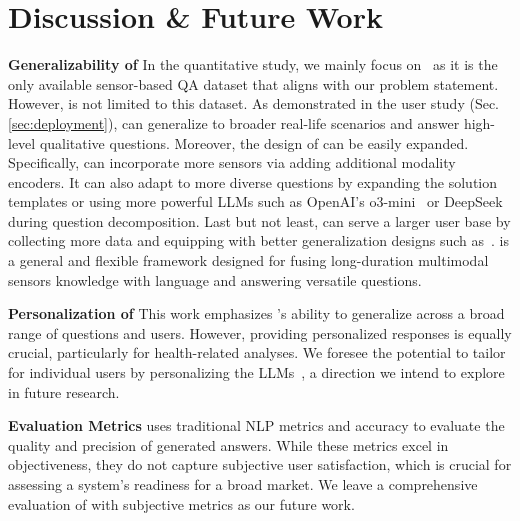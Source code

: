 \section{Discussion \& Future Work}
\label{sec:future-work}


\textbf{Generalizability of \Method}
In the quantitative study, we mainly focus on \Dataset~\citesensorqa as it is the only available sensor-based QA dataset that aligns with our problem statement. However, \Method is not limited to this dataset. As demonstrated in the user study (Sec.\ref{sec:deployment}), \Method can generalize to broader real-life scenarios and answer high-level qualitative questions.
Moreover, the design of \Method can be easily expanded.
Specifically, \Method can incorporate more sensors via adding additional modality encoders.
It can also adapt to more diverse questions by expanding the solution templates or using more powerful LLMs such as OpenAI's o3-mini~\cite{openaio3} or DeepSeek~\cite{deepseek} during question decomposition.
Last but not least, \Method can serve a larger user base by collecting more data and equipping with better generalization designs such as~\cite{xu2023practically}. \Method is a general and flexible framework designed for fusing long-duration multimodal sensors knowledge with language and answering versatile questions.



\textbf{Personalization of \Method} This work emphasizes \Method's ability to generalize across a broad range of questions and users. However, providing personalized responses is equally crucial, particularly for health-related analyses. We foresee the potential to tailor \Method for individual users by personalizing the LLMs~\cite{kim2024health}, a direction we intend to explore in future research.

\textbf{Evaluation Metrics} \Method uses traditional NLP metrics and accuracy to evaluate the quality and precision of generated answers. While these metrics excel in objectiveness, they do not capture subjective user satisfaction, which is crucial for assessing a system's readiness for a broad market. 
We leave a comprehensive evaluation of \Method with subjective metrics as our future work.



